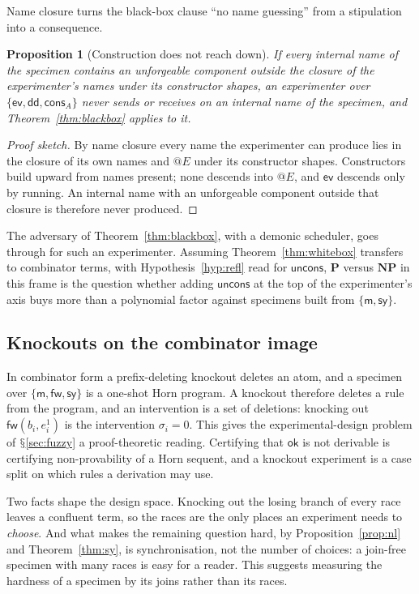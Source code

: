 \documentclass[11pt]{article}
\makeatletter
\theoremstyle{definition}
\theoremstyle{plain}
\newtheorem{proposition}[definition]{Proposition}
\theoremstyle{remark}
\newcommand{\quo}[1]{@#1}
\DeclareRobustCommand{\S}{\ifmmode\mathsection\else$\mathsection$\fi}
\newcommand{\ok}{\mathsf{ok}}
\newcommand{\Pclass}{\mathbf{P}}
\newcommand{\NPclass}{\mathbf{NP}}
\newcommand{\cm}{\mathsf{m}}
\newcommand{\cfw}{\mathsf{fw}}
\newcommand{\cdd}{\mathsf{dd}}
\newcommand{\csy}{\mathsf{sy}}
\newcommand{\cev}{\mathsf{ev}}
\newcommand{\ccons}{\mathsf{cons}}
\newcommand{\cuncons}{\mathsf{uncons}}
\makeatother
\begin{document}
\noindent
Name closure turns the black-box clause ``no name guessing'' from a
stipulation into a consequence.

\begin{proposition}[Construction does not reach down]\label{prop:closure}
If every internal name of the specimen contains an unforgeable component
outside the closure of the experimenter's names under its constructor
shapes, an experimenter over $\{\cev, \cdd, \ccons_A\}$ never sends or
receives on an internal name of the specimen, and
Theorem~\ref{thm:blackbox} applies to it.
\end{proposition}

\begin{proof}[Proof sketch]
By name closure every name the experimenter can produce lies in the
closure of its own names and $\quo{E}$ under its constructor shapes.
Constructors build upward from names present; none descends into
$\quo{E}$, and $\cev$ descends only by running. An internal name with an
unforgeable component outside that closure is therefore never produced.
\end{proof}

\noindent
The adversary of Theorem~\ref{thm:blackbox}, with a demonic scheduler,
goes through for such an experimenter. Assuming Theorem~\ref{thm:whitebox}
transfers to combinator terms, with Hypothesis~\ref{hyp:refl} read for
$\cuncons$, $\Pclass$ versus $\NPclass$ in this frame is the question
whether adding $\cuncons$ at the top of the experimenter's axis buys more
than a polynomial factor against specimens built from $\{\cm, \csy\}$.

\subsection{Knockouts on the combinator image}\label{sec:kocomb}

In combinator form a prefix-deleting knockout deletes an atom, and a
specimen over $\{\cm, \cfw, \csy\}$ is a one-shot Horn program. A
knockout therefore deletes a rule from the program, and an intervention
is a set of deletions: knocking out $\cfw(b_i, e_i^{1})$ is the
intervention $\sigma_i = 0$. This gives the experimental-design problem
of \S\ref{sec:fuzzy} a proof-theoretic reading. Certifying that $\ok$ is
not derivable is certifying non-provability of a Horn sequent, and a
knockout experiment is a case split on which rules a derivation may use.

Two facts shape the design space. Knocking out the losing branch of
every race leaves a confluent term, so the races are the only places an
experiment needs to \emph{choose}. And what makes the remaining question
hard, by Proposition~\ref{prop:nl} and Theorem~\ref{thm:sy}, is
synchronisation, not the number of choices: a join-free specimen with
many races is easy for a reader. This suggests measuring the hardness of
a specimen by its joins rather than its races.
\end{document}
